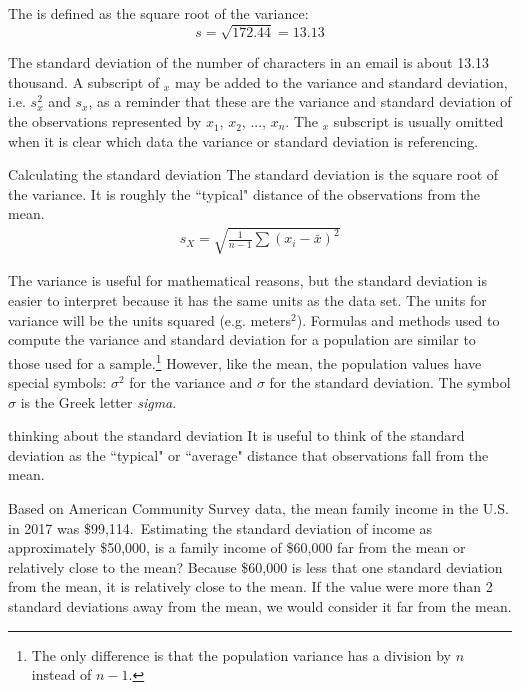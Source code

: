 The  is defined as the square root of the variance:
$$s=\sqrt{172.44} = 13.13$$

The standard deviation of the number of characters in an email is about 13.13 thousand. A subscript of $_x$ may be added to the variance and standard deviation, i.e. $s_x^2$ and $s_x^{}$, as a reminder that these are the variance and standard deviation of the observations represented by $x_1^{}$, $x_2^{}$, ..., $x_n^{}$. The $_{x}$ subscript is usually omitted when it is clear which data the variance or standard deviation is referencing.


\D{\newpage}

\begin{onebox}{Calculating the standard deviation}
The standard deviation is the square root of the variance. It is roughly the ``typical" distance of the observations from the mean.
\begin{eqnarray*}
\label{sdEquation}
s_{\scriptscriptstyle{X}}
 = \sqrt{\frac{1}{n-1} \sum{(x_i -  \bar{x})^2}}
\end{eqnarray*}
\end{onebox}

The variance is useful for mathematical reasons, but the standard deviation is easier to interpret because it has the same units as the data set. The units for variance will be the units squared (e.g. meters$^2$).
Formulas and methods used to compute the variance and standard deviation for a population are similar to those used for a sample.\footnote{The only difference is that the population variance has a division by $n$ instead of $n-1$.} However, like the mean, the population values have special symbols: $\sigma_{}^2$ for the variance and $\sigma$ for the standard deviation. The symbol $\sigma$  is the Greek letter \emph{sigma}.

\begin{onebox}{thinking about the standard deviation}
It is useful to think of the standard deviation as the ``typical" or ``average" distance that observations fall from the mean.\end{onebox}



\begin{examplewrap}
\begin{nexample}{Based on American Community Survey data, the mean family income in the U.S. in 2017 was \$99,114.\footnotemark \ Estimating the standard deviation of income as approximately \$50,000, is a family income of \$60,000 far from the mean or relatively close to the mean?}
Because \$60,000 is less that one standard deviation from the mean, it is relatively close to the mean. If the value were more than 2 standard deviations away from the mean, we would consider it far from the mean.
\end{nexample}
\end{examplewrap}

